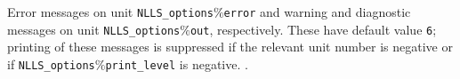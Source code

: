 \documentclass{spec}
\begin{document}


\hslgeneral


\hslio
   Error messages on unit {\tt NLLS\_options$\%$error} and warning
   and diagnostic messages on unit {\tt NLLS\_options$\%$out},
   respectively. These have default value {\tt 6};
   printing of these messages is suppressed if the relevant unit number
   is negative or if {\tt NLLS\_options$\%$print\_level} is negative.
.

\hslmethod
\label{method}

%

\hslexample




\end{document}
